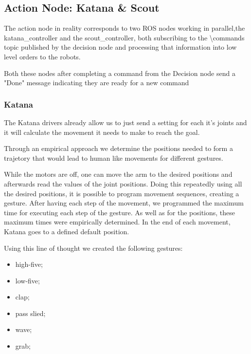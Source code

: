 \subsection{Action Node: Katana \& Scout}

The action node in reality corresponds to two ROS nodes working in parallel,the katana\_controller and the scout\_controller, both subscribing to the \textbackslash commands topic published by the decision node and processing that information into low level orders to the robots.

Both these nodes after completing a command from the Decision node send a "Done" message indicating they are ready for a new command

\subsubsection{Katana}


The Katana drivers already allow us to just send a setting for each it's joints and it will calculate the movement it needs to make to reach the goal. 

Through an empirical approach we determine the positions needed to form a trajetory that would lead to human like movements for different gestures.

While the motors are off, one can move the arm to the desired positions and afterwards read the values of the joint positions. Doing this repeatedly using all the desired positions, it is possible to program movement sequences, creating a gesture. After having each step of the movement, we programmed the maximum time for executing each step of the gesture. As well as for the positions, these maximum times were empirically determined. In the end of each movement, Katana goes to a defined default position.

Using this line of thought we created the following gestures: 

\begin{itemize}
\item high-five;
\item low-five; 
\item clap;
\item pass slied;
\item wave;
\item grab;
\end{itemize}

